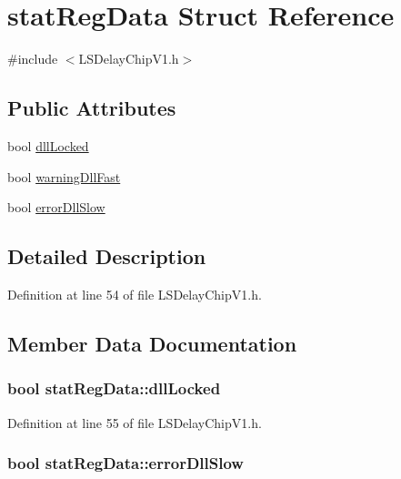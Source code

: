 \hypertarget{structstatRegData}{
\section{statRegData Struct Reference}
\label{structstatRegData}
}


{\ttfamily \#include $<$LSDelayChipV1.h$>$}\subsection*{Public Attributes}
\begin{DoxyCompactItemize}
\item 
bool \hyperlink{structstatRegData_acde4a715190d913538708ed40eb5d7b3}{dllLocked}
\item 
bool \hyperlink{structstatRegData_ab2c309fd8e307f289133e11a72d54dc2}{warningDllFast}
\item 
bool \hyperlink{structstatRegData_aef4d8d8abc4ce09fe4513a491718cf78}{errorDllSlow}
\end{DoxyCompactItemize}


\subsection{Detailed Description}


Definition at line 54 of file LSDelayChipV1.h.

\subsection{Member Data Documentation}
\hypertarget{structstatRegData_acde4a715190d913538708ed40eb5d7b3}{
\subsubsection[{dllLocked}]{\setlength{\rightskip}{0pt plus 5cm}bool {\bf statRegData::dllLocked}}}
\label{structstatRegData_acde4a715190d913538708ed40eb5d7b3}


Definition at line 55 of file LSDelayChipV1.h.\hypertarget{structstatRegData_aef4d8d8abc4ce09fe4513a491718cf78}{
\subsubsection[{errorDllSlow}]{\setlength{\rightskip}{0pt plus 5cm}bool {\bf statRegData::errorDllSlow}}}
\label{structstatRegData_aef4d8d8abc4ce09fe4513a491718cf78}


